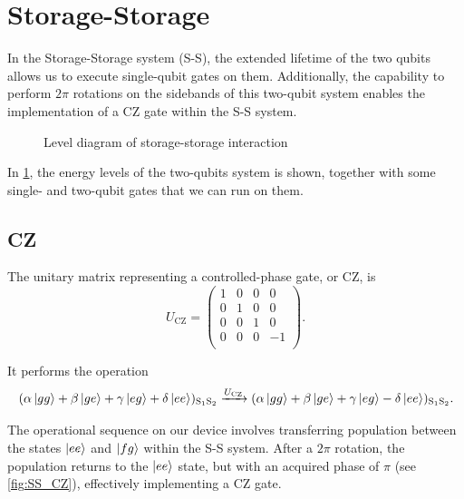 
\section{Storage-Storage}
\label{sec:S-S}

In the Storage-Storage system (S-S), the extended lifetime of the two qubits allows us to execute single-qubit gates on them.
Additionally, the capability to perform $2\pi$ rotations on the sidebands of this two-qubit system enables the implementation of a CZ gate within the S-S system.

\begin{figure}[b]
    \centering
    
    \vspace{-1cm}
    \caption{Level diagram of storage-storage interaction}
    \label{fig:SS_level}
\end{figure}

In \cref{fig:SS_level}, the energy levels of the two-qubits system is shown, together with some single- and two-qubit gates that we can run on them.

\subsection{CZ}

The unitary matrix representing a controlled-phase gate, or CZ, is
\begin{equation}
    U_{\text{CZ}} = 
    \begin{pmatrix}
    1 & 0 & 0 & 0 \\
    0 & 1 & 0 & 0 \\
    0 & 0 & 1 & 0 \\
    0 & 0 & 0 & -1 \\
\end{pmatrix}.
\end{equation}

It performs the operation
\begin{equation}
    (\alpha \ket{gg} + \beta \ket{ge} + \gamma \ket{eg} + \delta \ket{ee})_{\text{S}_1 \text{S}_2} \xrightarrow{U_{\text{CZ}}}
    (\alpha \ket{gg} + \beta \ket{ge} + \gamma \ket{eg} - \delta \ket{ee})_{\text{S}_1 \text{S}_2} . 
\end{equation}

The operational sequence on our device involves transferring population between the states $\ket{ee}$ and $\ket{fg}$ within the S-S system.
After a $2\pi$ rotation, the population returns to the $\ket{ee}$ state, but with an acquired phase of $\pi$ (see \cref{fig:SS_CZ}), effectively implementing a CZ gate.

